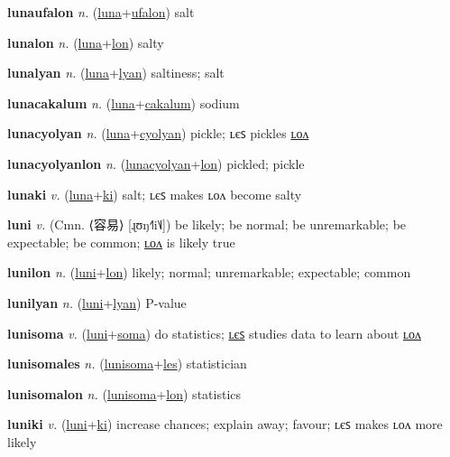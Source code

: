 \textbf{\hypertarget{lunaufalon}{lunaufalon}} \textit{n.} (\hyperlink{luna}{luna}+\allowbreak \hyperlink{ufalon}{ufalon})
salt

\textbf{\hypertarget{lunalon}{lunalon}} \textit{n.} (\hyperlink{luna}{luna}+\allowbreak \hyperlink{lon}{lon})
salty

\textbf{\hypertarget{lunalyan}{lunalyan}} \textit{n.} (\hyperlink{luna}{luna}+\allowbreak \hyperlink{lyan}{lyan})
saltiness; salt

\textbf{\hypertarget{lunacakalum}{lunacakalum}} \textit{n.} (\hyperlink{luna}{luna}+\allowbreak \hyperlink{cakalum}{cakalum})
sodium

\textbf{\hypertarget{lunacyolyan}{lunacyolyan}} \textit{n.} (\hyperlink{luna}{luna}+\allowbreak \hyperlink{cyolyan}{cyolyan})
pickle; ʟєꜱ pickles \hyperlink{lunacyolyanlon}{ʟᴏᴧ}

\textbf{\hypertarget{lunacyolyanlon}{lunacyolyanlon}} \textit{n.} (\hyperlink{lunacyolyan}{lunacyolyan}+\allowbreak \hyperlink{lon}{lon})
pickled; pickle

\textbf{\hypertarget{lunaki}{lunaki}} \textit{v.} (\hyperlink{luna}{luna}+\allowbreak \hyperlink{ki}{ki})
salt; ʟєꜱ makes ʟᴏᴧ become salty

\textbf{\hypertarget{luni}{luni}} \textit{v.} (Cmn. ⟨{\chinese{}容易}⟩ [ɻʊŋ˧˥i˥˩])
be likely; be normal; be unremarkable; be expectable; be common; \hyperlink{lunilon}{ʟᴏᴧ} is likely true

\textbf{\hypertarget{lunilon}{lunilon}} \textit{n.} (\hyperlink{luni}{luni}+\allowbreak \hyperlink{lon}{lon})
likely; normal; unremarkable; expectable; common

\textbf{\hypertarget{lunilyan}{lunilyan}} \textit{n.} (\hyperlink{luni}{luni}+\allowbreak \hyperlink{lyan}{lyan})
P-value

\textbf{\hypertarget{lunisoma}{lunisoma}} \textit{v.} (\hyperlink{luni}{luni}+\allowbreak \hyperlink{soma}{soma})
do statistics; \hyperlink{lunisomales}{ʟєꜱ} studies data to learn about \hyperlink{lunisomalon}{ʟᴏᴧ}

\textbf{\hypertarget{lunisomales}{lunisomales}} \textit{n.} (\hyperlink{lunisoma}{lunisoma}+\allowbreak \hyperlink{les}{les})
statistician

\textbf{\hypertarget{lunisomalon}{lunisomalon}} \textit{n.} (\hyperlink{lunisoma}{lunisoma}+\allowbreak \hyperlink{lon}{lon})
statistics

\textbf{\hypertarget{luniki}{luniki}} \textit{v.} (\hyperlink{luni}{luni}+\allowbreak \hyperlink{ki}{ki})
increase chances; explain away; favour; ʟєꜱ makes ʟᴏᴧ more likely

